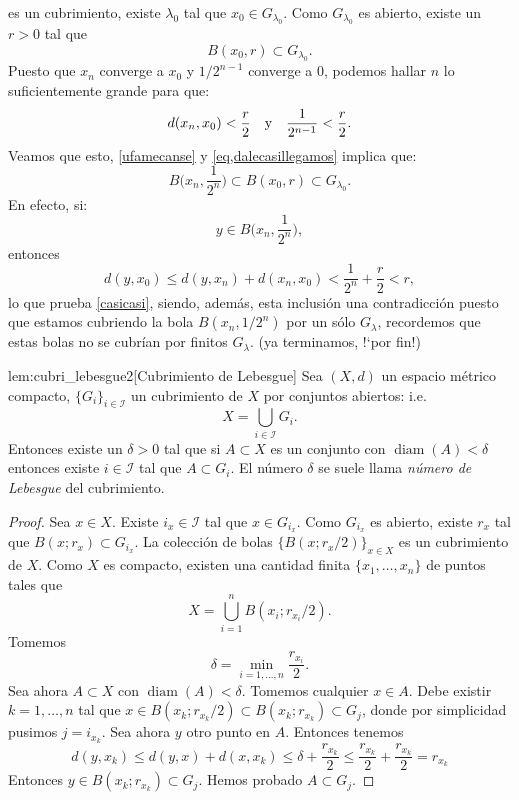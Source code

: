 \begin{demo}
es un cubrimiento, existe $\lambda_0$ tal que $x_0\in G_{\lambda_0}$. Como
$G_{\lambda_0}$ es abierto, existe un $r>0$ tal que
\begin{equation}\label{eq,dalecasillegamos}
	B(x_0,r)\subset G_{\lambda_0}.
\end{equation}
Puesto que $x_n$ converge a $x_0$ y $1/2^{n-1}$ converge a 0,
podemos hallar $n$ lo suficientemente grande para que:
\begin{equation}\label{ufamecanse}
	d(x_n,x_0)<\frac{r}{2}\quad\hbox{y}\quad
	\frac{1}{2^{n-1}}<\frac{r}{2}.
\end{equation}
Veamos que esto, \eqref{ufamecanse} y \eqref{eq,dalecasillegamos}
implica que:
\begin{equation}\label{casicasi}
	B\Big(x_n,\frac{1}{2^n}\Big)\subset B(x_0,r)\subset G_{\lambda_0}.
\end{equation}
En efecto, si:
\[
	 y\in B\Big(x_n,\frac{1}{2^n}\Big),
\]
entonces
\[
	d(y,x_0)\leq d(y,x_n)+d(x_n,x_0)<\frac{1}{2^n}+\frac{r}{2}<r,
\]
lo que prueba \eqref{casicasi}, siendo, además, esta inclusión
una contradicción puesto que estamos cubriendo la bola
$B(x_n,1/2^n)$ por un sólo $G_{\lambda}$, recordemos que estas
bolas no se cubrían por finitos $G_{\lambda}$. (ya terminamos,
!`por fin!)
 \end{demo}
 
\begin{lema}{lem:cubri_lebesgue2}[Cubrimiento de Lebesgue] Sea $(X,d)$ un espacio métrico compacto, $\{G_i\}_{i\in\mathscr{I}}$ un cubrimiento de $X$ por conjuntos abiertos: i.e.
\[
 X=\bigcup_{i\in\mathscr{I}}G_i.
\]
Entonces existe un $\delta>0$ tal que si $A\subset X$ es un conjunto con $\operatorname{diam}(A)<\delta$ entonces existe $i\in\mathscr{I}$ tal que $A\subset G_i$. El número $\delta$ se suele llama  \emph{número de Lebesgue}  del cubrimiento.
 
\end{lema}
\begin{proof} Sea $x\in X$. Existe $i_x\in\mathscr{I}$ tal que $x\in G_{i_x}$. Como $G_{i_x}$ es abierto, existe $r_x$ tal que $B(x;r_x)\subset G_{i_x}$. La colección de bolas $\{B(x;r_x/2)\}_{x\in X}$ es un cubrimiento de $X$. Como $X$ es compacto, existen una cantidad finita $\{x_1,\ldots,x_n\}$ de puntos tales que
\[
 X=\bigcup_{i=1}^n B(x_i;r_{x_i}/2).
\]
Tomemos 
\[
 \delta=\min_{i=1,\ldots,n}\frac{r_{x_i}}{2}.
\]
Sea ahora $A\subset X$ con $\operatorname{diam}(A)<\delta$. Tomemos cualquier $x\in A$. Debe existir $k=1,\ldots,n$ tal que $x\in B(x_k;r_{x_k}/2)\subset B(x_k;r_{x_k})\subset G_j$, donde por simplicidad pusimos $j=i_{x_k}$. Sea ahora $y$ otro punto en $A$. Entonces tenemos
\[
 d(y,x_k)\leq d(y,x)+d(x,x_k)\leq\delta + \frac{r_{x_k}}{2}\leq\frac{r_{x_k}}{2}+ \frac{r_{x_k}}{2}=r_{x_k}
\]
Entonces $y\in B(x_k;r_{x_k})\subset  G_j$. Hemos probado $A\subset G_j$. 
\end{proof}
 
